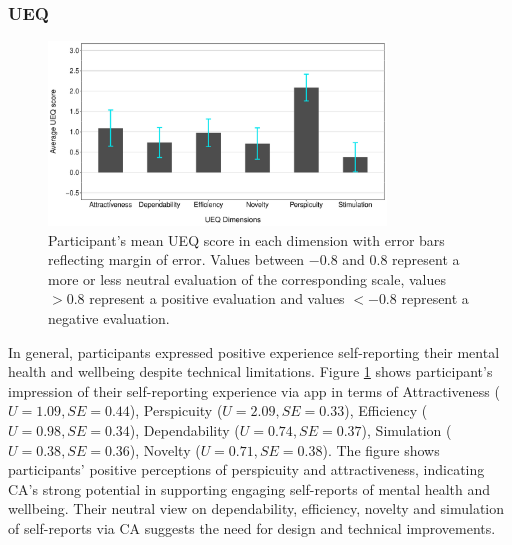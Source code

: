     \subsubsection{\acl{UEQ}}    
    \begin{figure}
        \centering
        \includegraphics[clip, trim=0cm 0cm 0.5cm 0.5cm, width=0.8\textwidth]{figures/ueq.pdf}
        \caption{Participant's mean \ac{UEQ} score in each dimension with error bars reflecting margin of error.
        Values between $-0.8$ and $0.8$ represent a more or less neutral evaluation of the corresponding scale,  values $> 0.8$ represent a positive evaluation and values $< -0.8$ represent a negative evaluation.}
        \label{fig:ueq}
    \end{figure}

    In general, participants expressed positive experience self-reporting their mental health and wellbeing despite technical limitations. 
    Figure \ref{fig:ueq} shows participant's impression of their self-reporting experience via \acl{app} in terms of
        Attractiveness ($U = 1.09, SE = 0.44 $),
        Perspicuity ($U = 2.09, SE = 0.33 $),
        Efficiency ($U = 0.98, SE = 0.34 $),
        Dependability ($U = 0.74, SE = 0.37 $),
        Simulation ($U = 0.38, SE = 0.36 $),
        Novelty ($U = 0.71, SE = 0.38 $).
    The figure shows participants' positive perceptions of perspicuity and attractiveness, indicating \ac{CA}'s strong potential in supporting engaging self-reports of mental health and wellbeing. Their neutral view on dependability, efficiency, novelty and simulation of self-reports via \ac{CA} suggests the need for design and technical improvements.


